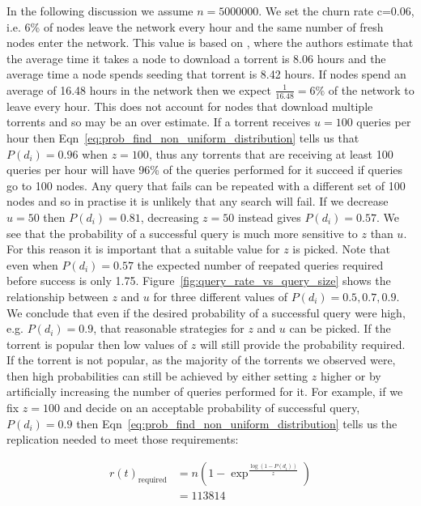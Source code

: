     In the following discussion we assume $n=5000000$. We set the churn rate c=0.06, i.e. 6\% of nodes leave the network every hour and the same number of fresh nodes enter the network. This value is based on \cite{Guo2007,Izal2004}, where the authors estimate that the average time it takes a node to download a torrent is 8.06 hours and the average time a node spends seeding that torrent is 8.42 hours. If nodes spend an average of 16.48 hours in the network then we expect $\frac{1}{16.48}=6\%$ of the network to leave every hour. This does not account for nodes that download multiple torrents and so may be an over estimate. If a torrent receives $u=100$ queries per hour then Eqn~\ref{eq:prob_find_non_uniform_distribution} tells us that $P(d_i)=0.96$ when $z=100$, thus any torrents that are receiving at least 100 queries per hour will have 96\% of the queries performed for it succeed if queries go to 100 nodes. Any query that fails can be repeated with a different set of 100 nodes and so in practise it is unlikely that any search will fail. If we decrease $u=50$ then $P(d_i)=0.81$, decreasing $z=50$ instead gives $P(d_i)=0.57$. We see that the probability of a successful query is much more sensitive to $z$ than $u$. For this reason it is important that a suitable value for $z$ is picked. Note that even when $P(d_i)=0.57$ the expected number of reepated queries required before success is only 1.75. Figure~\ref{fig:query_rate_vs_query_size} shows the relationship between $z$ and $u$ for three different values of $P(d_i)=0.5,0.7,0.9$. We conclude that even if the desired probability of a successful query were high, e.g. $P(d_i)=0.9$, that reasonable strategies for $z$ and $u$ can be picked. If the torrent is popular then low values of $z$ will still provide the probability required. If the torrent is not popular, as the majority of the torrents we observed were, then high probabilities can still be achieved by either setting $z$ higher or by artificially increasing the number of queries performed for it. For example, if we fix $z=100$ and decide on an acceptable probability of successful query, $P(d_i)=0.9$ then Eqn~\ref{eq:prob_find_non_uniform_distribution} tells us the replication needed to meet those requirements:

    \begin{align}
        r(t)_{\textrm{required}} &= n(1-\exp^{\frac{\log(1-P(d_i))}{z}}) \label{eq:rt_required}\\
                                 &= 113814
    \end{align}

